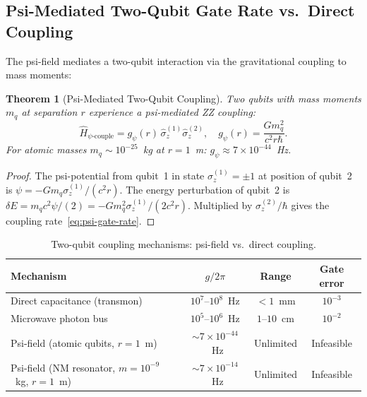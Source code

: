 \documentclass[11pt]{article}
\newtheorem{theorem}{Theorem}[section]
\theoremstyle{definition}
\theoremstyle{remark}
\begin{document}
\subsection{Psi-Mediated Two-Qubit Gate Rate vs.\ Direct Coupling}

The psi-field mediates a two-qubit interaction via the gravitational
coupling to mass moments:

\begin{theorem}[Psi-Mediated Two-Qubit Coupling]
\label{thm:psi-gate}
Two qubits with mass moments $m_q$ at separation $r$ experience a
psi-mediated ZZ coupling:
\begin{equation}
  \hat{H}_{\psi\text{-couple}} = g_\psi(r)\,\hat{\sigma}_z^{(1)}\hat{\sigma}_z^{(2)},
  \quad g_\psi(r) = \frac{Gm_q^2}{c^2 r\hbar}. \label{eq:psi-gate-rate}
\end{equation}
For atomic masses $m_q\sim10^{-25}$~kg at $r=1$~m:
$g_\psi \approx 7\times10^{-44}$~Hz.
\end{theorem}

\begin{proof}
The psi-potential from qubit~1 in state $\sigma_z^{(1)} = \pm1$ at
position of qubit~2 is $\psi = -Gm_q\sigma_z^{(1)}/(c^2 r)$.
The energy perturbation of qubit~2 is $\delta E = m_q c^2\psi/(2)
= -Gm_q^2\sigma_z^{(1)}/(2c^2 r)$.  Multiplied by $\sigma_z^{(2)}/\hbar$
gives the coupling rate~\eqref{eq:psi-gate-rate}.
\end{proof}

\begin{table}[h]
\centering
\caption{Two-qubit coupling mechanisms: psi-field vs.\ direct coupling.}
\label{tab:coupling-comparison}
\begin{tabular}{@{}lccc@{}}
\toprule
Mechanism & $g/2\pi$ & Range & Gate error \\
\midrule
Direct capacitance (transmon) & $10^7$--$10^8$~Hz & $<1$~mm & $10^{-3}$ \\
Microwave photon bus & $10^5$--$10^6$~Hz & $1$--$10$~cm & $10^{-2}$ \\
Psi-field (atomic qubits, $r=1$~m) & $\sim7\times10^{-44}$~Hz & Unlimited & Infeasible \\
Psi-field (NM resonator, $m=10^{-9}$~kg, $r=1$~m) & $\sim7\times10^{-14}$~Hz & Unlimited & Infeasible \\
\bottomrule
\end{tabular}
\end{table}

\end{document}
